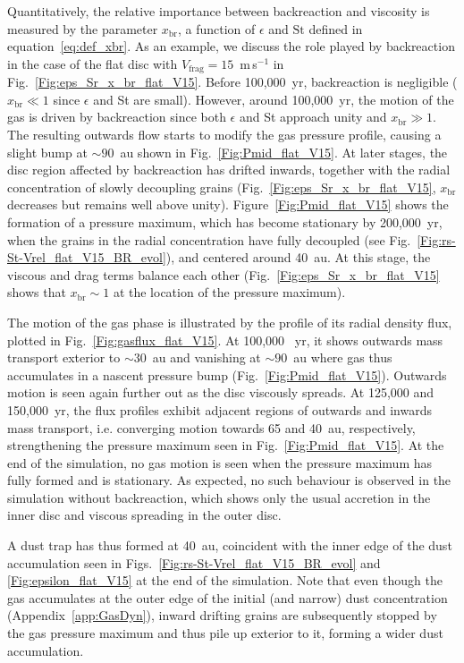 \documentclass[a4paper,fleqn,usenatbib]{mnras}
\newcommand{\Vfrag}{V_\mathrm{frag}}  %
\newcommand{\St}{\mathrm{St}}         %
\begin{document}
Quantitatively, the relative importance between backreaction and viscosity is measured by the parameter $x_\mathrm{br}$, a function of $\epsilon$ and $\St$ defined in equation~\ref{eq:def_xbr}. As an example, we discuss the role played by backreaction in the case of the flat disc with $\Vfrag=15$~m\,s$^{-1}$ in Fig.~\ref{Fig:eps_Sr_x_br_flat_V15}. Before 100,000~yr, backreaction is negligible ($x_\mathrm{br}\ll1$ since $\epsilon$ and St are small). However, around 100,000~yr, the motion of the gas is driven by backreaction since both $\epsilon$ and St approach unity and $x_\mathrm{br}\gg1$. The resulting outwards flow starts to modify the gas pressure profile, causing a slight bump at $\sim90$~au shown in Fig.~\ref{Fig:Pmid_flat_V15}. At later stages, the disc region affected by backreaction has drifted inwards, together with the radial concentration of slowly decoupling grains (Fig.~\ref{Fig:eps_Sr_x_br_flat_V15}, $x_\mathrm{br}$ decreases but remains well above unity). Figure~\ref{Fig:Pmid_flat_V15} shows the formation of a pressure maximum, which has become stationary by 200,000~yr, when the grains in the radial concentration have fully decoupled (see Fig.~\ref{Fig:rs-St-Vrel_flat_V15_BR_evol}), and centered around 40~au. At this stage, the viscous and drag terms balance each other (Fig.~\ref{Fig:eps_Sr_x_br_flat_V15} shows that $x_\mathrm{br}\sim1$ at the location of the pressure maximum).

The motion of the gas phase is illustrated by the profile of its radial density flux, plotted in Fig.~\ref{Fig:gasflux_flat_V15}. At 100,000 ~yr, it shows outwards mass transport exterior to $\sim30$~au and vanishing at $\sim90$~au where gas thus accumulates in a nascent pressure bump (Fig.~\ref{Fig:Pmid_flat_V15}). Outwards motion is seen again further out as the disc viscously spreads. At 125,000 and 150,000~yr, the flux profiles exhibit adjacent regions of outwards and inwards mass transport, i.e. converging motion towards 65 and 40~au, respectively, strengthening the pressure maximum seen in Fig.~\ref{Fig:Pmid_flat_V15}. At the end of the simulation, no gas motion is seen when the pressure maximum has fully formed and is stationary. As expected, no such behaviour is observed in the simulation without backreaction, which shows only the usual accretion in the inner disc and viscous spreading in the outer disc.

A dust trap has thus formed at 40~au, coincident with the inner edge of the dust accumulation seen in Figs.~\ref{Fig:rs-St-Vrel_flat_V15_BR_evol} and \ref{Fig:epsilon_flat_V15} at the end of the simulation. Note that even though the gas accumulates at the outer edge of the initial (and narrow) dust concentration (Appendix~\ref{app:GasDyn}), inward drifting grains are subsequently stopped by the gas pressure maximum and thus pile up exterior to it, forming a wider dust accumulation.
\end{document}
